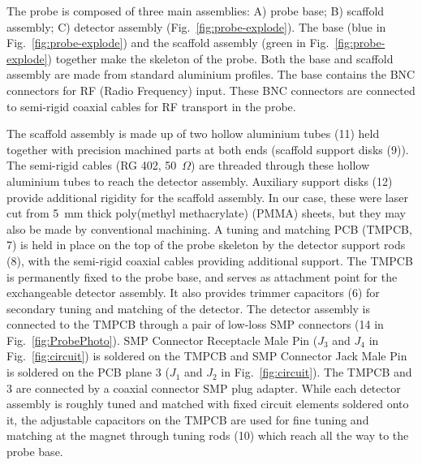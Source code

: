 \documentclass[preprint,5p]{elsarticle}
\newcommand{\fig}[1]{Fig.~\ref{#1}}
\begin{document}
The probe is composed of three main assemblies: A) probe base; B) scaffold assembly;
C) detector assembly (\fig{fig:probe-explode}).
The  base (blue in \fig{fig:probe-explode}) and the scaffold assembly
(green in \fig{fig:probe-explode}) together make the skeleton of the probe.
Both the base and scaffold assembly are made from standard aluminium profiles.
The base contains the BNC connectors for RF (Radio Frequency) input.
These BNC connectors are connected to semi-rigid coaxial cables for
RF transport in the probe.

The scaffold assembly is made up of two hollow aluminium tubes (11) held together with
precision machined parts at both ends (scaffold support disks (9)).\cbstart
The semi-rigid cables (RG 402, 50~$\Omega$) are  threaded through these hollow aluminium tubes
to reach the detector assembly.\cbend
Auxiliary support disks (12) provide additional rigidity for the scaffold assembly.
In our case, these were laser cut from 5~mm thick poly(methyl methacrylate) (PMMA) sheets,
but they may also be made by conventional machining.
A tuning and matching PCB (TMPCB, 7) is held in place on the top of the probe skeleton by
the detector support rods (8), with the semi-rigid coaxial cables providing
additional support.
The TMPCB is permanently fixed to the probe base, and serves as attachment point
for the exchangeable detector assembly. \cbstart It also provides
trimmer capacitors (6) for secondary tuning and matching of the detector.\cbend
 The detector assembly is connected to the TMPCB through a pair of
low-loss SMP connectors (14 in \fig{fig:ProbePhoto}). \cbstart SMP Connector Receptacle Male Pin ($J_3$ and $J_4$ in \fig{fig:circuit}) is soldered on the TMPCB and SMP Connector Jack Male Pin is soldered on the PCB plane 3 ($J_1$ and $J_2$ in \fig{fig:circuit}). The TMPCB and 3 are connected by a coaxial connector SMP plug adapter.\cbend
While each detector assembly is roughly
tuned and matched with fixed circuit elements soldered onto it,
the adjustable capacitors on the TMPCB are used for
fine tuning and matching
at the magnet through tuning rods (10) which reach all the way to the probe base.
\end{document}
